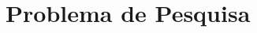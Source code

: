 \documentclass[
	12pt,				%
	openright,			%
	oneside,			%
	a4paper,			%
	english,			%
	french,				%
	spanish,			%
	brazil,				%
	]{abntex2}
\begin{document}

\frenchspacing


\imprimircapa

\imprimirfolhaderosto






\tableofcontents*
\cleardoublepage


\textual

\chapter{Problema de Pesquisa}
\end{document}
